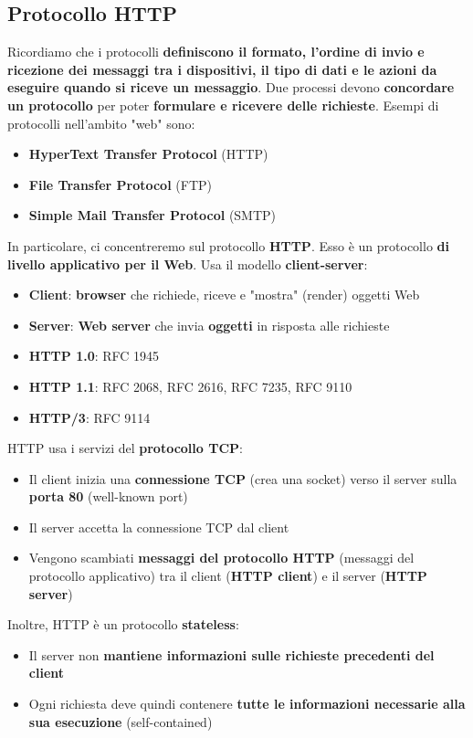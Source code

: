 \documentclass[12pt]{article}
\begin{document}
\subsection{Protocollo HTTP}
Ricordiamo che i protocolli \textbf{definiscono il formato, l'ordine di invio e ricezione dei messaggi tra i dispositivi, il tipo di dati e le azioni da eseguire quando si riceve un messaggio}. Due processi devono \textbf{concordare un protocollo} per poter \textbf{formulare e ricevere delle richieste}. Esempi di protocolli nell'ambito "web" sono:
\begin{itemize}
    \item \textbf{HyperText Transfer Protocol} (HTTP)
    \item \textbf{File Transfer Protocol} (FTP)
    \item \textbf{Simple Mail Transfer Protocol} (SMTP)
\end{itemize}
In particolare, ci concentreremo sul protocollo \textbf{HTTP}. Esso è un protocollo \textbf{di livello applicativo per il Web}. Usa il modello \textbf{client-server}:
\begin{itemize}
    \item \textbf{Client}: \textbf{browser} che richiede, riceve e "mostra" (render) oggetti Web
    \item \textbf{Server}: \textbf{Web server} che invia \textbf{oggetti} in risposta alle richieste
    \item \textbf{HTTP 1.0}: RFC 1945
    \item \textbf{HTTP 1.1}: RFC 2068, RFC 2616, RFC 7235, RFC 9110
    \item \textbf{HTTP/3}: RFC 9114
\end{itemize}
HTTP usa i servizi del \textbf{protocollo TCP}:
\begin{itemize}
    \item Il client inizia una \textbf{connessione TCP} (crea una socket) verso il server sulla \textbf{porta 80} (well-known port)
    \item Il server accetta la connessione TCP dal client
    \item Vengono scambiati \textbf{messaggi del protocollo HTTP} (messaggi del protocollo applicativo) tra il client (\textbf{HTTP client}) e il server (\textbf{HTTP server})
\end{itemize}
Inoltre, HTTP è un protocollo \textbf{stateless}:
\begin{itemize}
    \item Il server non \textbf{mantiene informazioni sulle richieste precedenti del client}
    \item Ogni richiesta deve quindi contenere \textbf{tutte le informazioni necessarie alla sua esecuzione} (self-contained)
\end{itemize}
\end{document}
